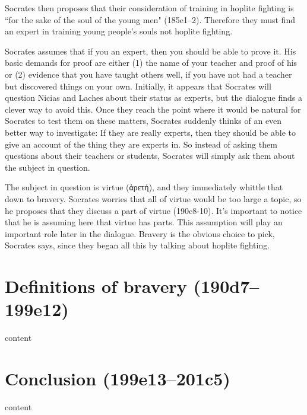 \documentclass[11pt]{article}
\begin{document}
Socrates then proposes that their consideration of training in hoplite fighting is ``for the sake of the soul of the young men" (185e1--2).  Therefore they must find an expert in training young people's souls not hoplite fighting.

Socrates assumes that if you an expert, then you should be able to prove it.  His basic demands for proof are either (1) the name of your teacher and proof of his  or (2) evidence that you have taught others well, if you have not had a teacher but discovered things on your own.  Initially, it appears that Socrates will question Nicias and Laches about their status as experts, but the dialogue finds a clever way to avoid this.  Once they reach the point where it would be natural for Socrates to test them on these matters, Socrates suddenly thinks of an even better way to investigate: If they are really experts, then they should be able to give an account of the thing they are experts in.  So instead of asking them questions about their teachers or students, Socrates will simply ask them about the subject in question.

The subject in question is virtue (ἀρετή), and they immediately whittle that down to bravery.  Socrates worries that all of virtue would be too large a topic, so he proposes that they discuss a part of virtue (190c8-10).  It's important to notice that he is assuming here that virtue has parts.  This assumption will play an important role later in the dialogue.  Bravery is the obvious choice to pick, Socrates says, since they began all this by talking about hoplite fighting.


\section{Definitions of bravery (190d7--199e12)}

content

\section{Conclusion (199e13--201c5)}

content


\newpage


\end{document}
